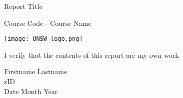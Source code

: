 \begin{titlepage}
    \begin{center}
        \vspace*{1cm}
        \LARGE
        Report Title
 
        \vspace{0.5cm}
        \Large
        Course Code - Course Name
             
        \vspace{1.5cm}
      
        \texttt{[image: UNSW-logo.png]}

        \vspace{2cm}

        \normalsize
        I verify that the contents of this report are my own work
        \vspace{1cm}
        \begin{flushright}
        Firstname Lastname \\
        zID\\
        Date Month Year\\
        \end{flushright}
             
    \end{center}
\end{titlepage}